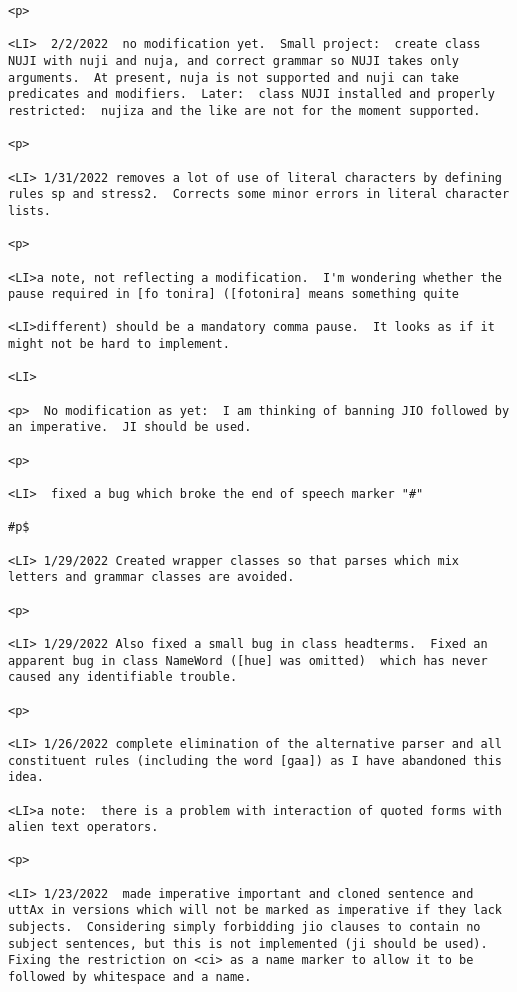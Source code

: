 \documentclass[12pt]{article}
\begin{document}
\begin{lstlisting}
<p>

<LI>  2/2/2022  no modification yet.  Small project:  create class NUJI with nuji and nuja, and correct grammar so NUJI takes only arguments.  At present, nuja is not supported and nuji can take predicates and modifiers.  Later:  class NUJI installed and properly restricted:  nujiza and the like are not for the moment supported.

<p>

<LI> 1/31/2022 removes a lot of use of literal characters by defining rules sp and stress2.  Corrects some minor errors in literal character lists.

<p>

<LI>a note, not reflecting a modification.  I'm wondering whether the pause required in [fo tonira] ([fotonira] means something quite

<LI>different) should be a mandatory comma pause.  It looks as if it might not be hard to implement.

<LI>

<p>  No modification as yet:  I am thinking of banning JIO followed by an imperative.  JI should be used.

<p>

<LI>  fixed a bug which broke the end of speech marker "#"

#p$

<LI> 1/29/2022 Created wrapper classes so that parses which mix letters and grammar classes are avoided.

<p>

<LI> 1/29/2022 Also fixed a small bug in class headterms.  Fixed an apparent bug in class NameWord ([hue] was omitted)  which has never caused any identifiable trouble.

<p>

<LI> 1/26/2022 complete elimination of the alternative parser and all constituent rules (including the word [gaa]) as I have abandoned this idea.

<LI>a note:  there is a problem with interaction of quoted forms with alien text operators.

<p>

<LI> 1/23/2022  made imperative important and cloned sentence and uttAx in versions which will not be marked as imperative if they lack subjects.  Considering simply forbidding jio clauses to contain no subject sentences, but this is not implemented (ji should be used).  Fixing the restriction on <ci> as a name marker to allow it to be followed by whitespace and a name.


\end{lstlisting}
\end{document}
